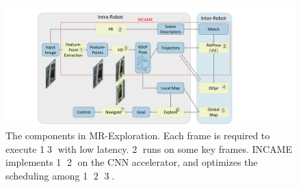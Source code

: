 \begin{figure}[t]
    \centering
    \setlength{\abovecaptionskip}{0cm} 
    \setlength{\belowcaptionskip}{-0.4cm} 
	\includegraphics[width=0.99\linewidth]{fig/maexp.pdf}
     \caption{
        The components in MR-Exploration.  Each frame is required to execute \textcircled{1}\textcircled{3} with low latency. \textcircled{2} runs on some key frames. INCAME implements \textcircled{1} \textcircled{2} on the CNN accelerator, and optimizes the scheduling among \textcircled{1} \textcircled{2}  \textcircled{3}.
    }
	\label{fig:maexp}
\end{figure}






